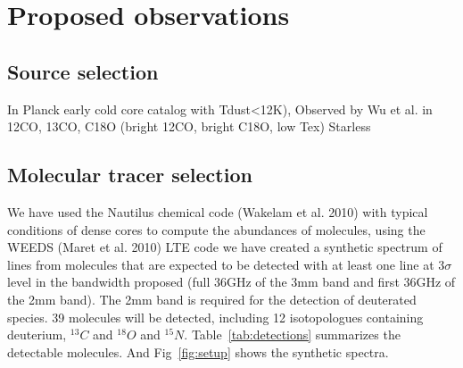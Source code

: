 \section{Proposed observations}
\subsection{Source selection}
  In Planck early cold core catalog with Tdust<12K),
  Observed by Wu et al. in 12CO, 13CO, C18O (bright 12CO, bright C18O, low Tex)
  Starless 
\subsection{Molecular tracer selection}
  We have used the Nautilus chemical code (Wakelam et al. 2010) with typical conditions of dense cores to compute the abundances of molecules, using the WEEDS (Maret et al. 2010) LTE code we have created a synthetic spectrum of lines from molecules that are expected to be detected with at least one line at 3$\sigma$ level in the bandwidth proposed (full 36GHz of the 3mm band and first 36GHz of the 2mm band). The 2mm band is required for the detection of deuterated species. 39 molecules will be detected, including 12 isotopologues containing deuterium, $^{13}C$ and $^{18}O$ and $^{15}N$. Table~\ref{tab:detections} summarizes the detectable molecules. And Fig~\ref{fig:setup} shows the synthetic spectra.
  

  
  
  
  
  
  
  
  
  